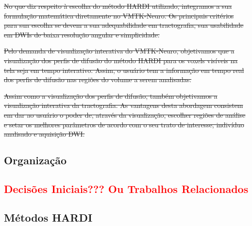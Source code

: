 \documentclass[
    12pt,                %
    oneside,            %
    a4paper,            %
    english,            %
    french,                %
    spanish,            %
    brazil                %
    ]{abntex2}
\begin{document}
\sout{No que diz respeito à escolha do método HARDI utilizado, integramos a sua formulação matemática diretamente no VMTK-Neuro. Os principais critérios para sua escolha se devem a sua adequabilidade em tractografia, sua usabilidade em DWIs de baixa resolução angular e simplicidade.}

\sout{Pelo demanda de visualização interativa do VMTK-Neuro, objetivamos que a visualização dos perfis de difusão do método HARDI para os voxels visíveis na tela seja em tempo interativo. Assim, o usuário tem a informação em tempo real dos perfis de difusão nas regiões do volume a serem analisadas.}

\sout{Assim como a visualização dos perfis de difusão, também objetivamos a visualização interativa da tractografia. As vantagens desta abordagem consistem em dar ao usuário o poder de, através da visualização, escolher regiões de análise e setar os melhores parâmetros de acordo com o seu trato de interesse, indivíduo analisado e aquisição DWI.}

%
%
%



\section{Organização}
\label{sec:intro_organizacao}

\textcolor{red}{
\chapter{Decisões Iniciais??? Ou Trabalhos Relacionados}
\label{chapter::decisoesiniciais}
}

\section{Métodos HARDI}
\end{document}
